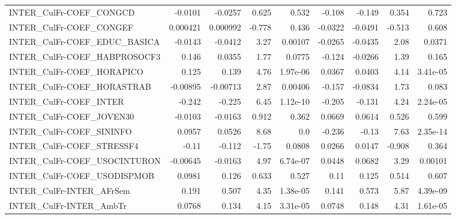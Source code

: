 \begin{tabular}{lrrrrrrrr}
INTER\_CulFr-COEF\_CONGCD                &     -0.0101 &      -0.0257 &   0.625 &    0.532 &     -0.108 &      -0.149 &        0.354 &         0.723 \\
INTER\_CulFr-COEF\_CONGEF                &    0.000421 &     0.000992 &  -0.778 &    0.436 &    -0.0322 &     -0.0491 &       -0.513 &         0.608 \\
INTER\_CulFr-COEF\_EDUC\_BASICA           &     -0.0143 &      -0.0412 &    3.27 &  0.00107 &    -0.0265 &     -0.0435 &         2.08 &        0.0371 \\
INTER\_CulFr-COEF\_HABPROSOCF3           &       0.146 &       0.0355 &    1.77 &   0.0775 &     -0.124 &     -0.0266 &         1.39 &         0.165 \\
INTER\_CulFr-COEF\_HORAPICO              &       0.125 &        0.139 &    4.76 & 1.97e-06 &     0.0367 &      0.0403 &         4.14 &      3.41e-05 \\
INTER\_CulFr-COEF\_HORASTRAB             &    -0.00895 &     -0.00713 &    2.87 &  0.00406 &     -0.157 &     -0.0834 &         1.73 &         0.083 \\
INTER\_CulFr-COEF\_INTER                 &      -0.242 &       -0.225 &    6.45 & 1.12e-10 &     -0.205 &      -0.131 &         4.24 &      2.24e-05 \\
INTER\_CulFr-COEF\_JOVEN30               &     -0.0103 &      -0.0163 &   0.912 &    0.362 &     0.0669 &      0.0614 &        0.526 &         0.599 \\
INTER\_CulFr-COEF\_SININFO               &      0.0957 &       0.0526 &    8.68 &      0.0 &     -0.236 &       -0.13 &         7.63 &      2.35e-14 \\
INTER\_CulFr-COEF\_STRESSF4              &       -0.11 &       -0.112 &   -1.75 &   0.0808 &     0.0266 &      0.0147 &       -0.908 &         0.364 \\
INTER\_CulFr-COEF\_USOCINTURON           &    -0.00645 &      -0.0163 &    4.97 & 6.74e-07 &     0.0448 &      0.0682 &         3.29 &       0.00101 \\
INTER\_CulFr-COEF\_USODISPMOB            &      0.0981 &        0.126 &   0.633 &    0.527 &       0.11 &       0.125 &        0.514 &         0.607 \\
INTER\_CulFr-INTER\_AFrSem               &       0.191 &        0.507 &    4.35 & 1.38e-05 &      0.141 &       0.573 &         5.87 &      4.39e-09 \\
INTER\_CulFr-INTER\_AmbTr                &      0.0768 &        0.134 &    4.15 & 3.31e-05 &     0.0748 &       0.148 &         4.31 &      1.61e-05 \\

\end{tabular}
